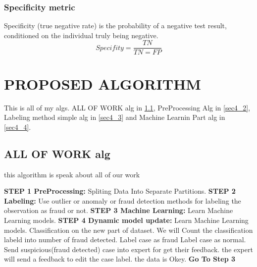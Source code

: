 \documentclass[preprint,12pt]{elsarticle}
\begin{document}
\subsubsection{Specificity  metric}
\label{sec3_5_8}

 Specificity (true negative rate) is the probability of a negative test result, conditioned on the individual truly being negative.\\
$$Specifity=\frac{TN}{TN=FP}$$



\section{PROPOSED ALGORITHM}
\label{sec4}

This is all of my algs.
ALL OF WORK alg in \ref{sec4_1},
PreProcessing Alg in \ref{sec4_2},
Labeling method simple alg in \ref{sec4_3} and
Machine Learnin Part alg in \ref{sec4_4}.

\subsection{ALL OF WORK alg}
\label{sec4_1}
this algorithm is speak about all of our work
\begin{algorithm}
	\caption{All of Work}\label{algo:allofwork}
	\begin{algorithmic}
		\STATE \textbf{STEP 1 PreProcessing:}
		\STATE Spliting Data Into Separate Partitions.
		\STATE \textbf{STEP 2 Labeling:}
		\STATE Use outlier or anomaly or fraud detection methods for labeling the observation as fraud or not.
		\STATE \textbf{STEP 3 Machine Learning:}
		\STATE Learn Machine Learning models.
		\STATE \textbf{STEP 4 Dynamic model update:}
		\STATE Learn Machine Learning models.
		\STATE Classification on the new part of dataset.
		\ENDFOR
		\STATE We will Count the classification labeld into number of fraud detected.
			\STATE Label case as fraud
			\ELSE 
			\STATE Label case as normal.
		\ENDIF
		\STATE 	Send suspicious(fraud detected) case into expert for get their feedback.
			\STATE the expert will send a feedback to edit the case label.
		\ELSE 
		\STATE the data is Okey.
		\ENDIF
		\ENDFOR
		\ENDWHILE
		\STATE \textbf{Go To Step 3}	
	\end{algorithmic}
\end{algorithm}
\end{document}
